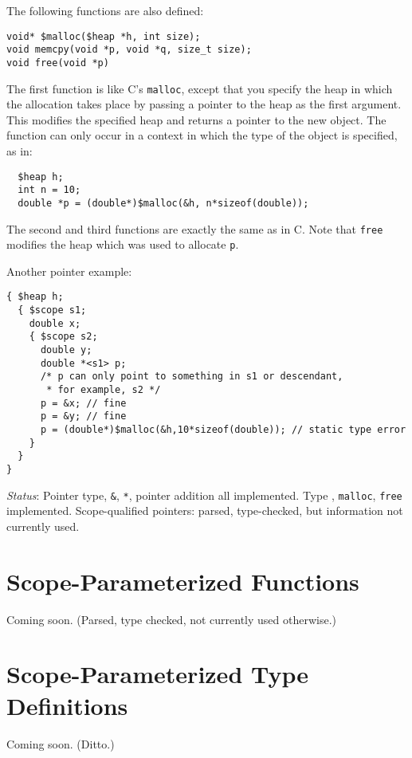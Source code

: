 \documentclass[11pt, oneside, letterpaper]{book}
\begin{document}
The following functions are also defined:
\begin{verbatim}
void* $malloc($heap *h, int size);
void memcpy(void *p, void *q, size_t size);
void free(void *p)
\end{verbatim}
The first function is like C's \texttt{malloc}, except that you
specify the heap in which the allocation takes place by passing a
pointer to the heap as the first argument.  This modifies the
specified heap and returns a pointer to the new object.  The function
can only occur in a context in which the type of the object is
specified, as in:
\begin{verbatim}
  $heap h;
  int n = 10;
  double *p = (double*)$malloc(&h, n*sizeof(double));
\end{verbatim}
The second and third functions are exactly the same as in C. Note that
\texttt{free} modifies the heap which was used to allocate \texttt{p}.

Another pointer example:
\begin{small}
\begin{verbatim}
{ $heap h;
  { $scope s1;
    double x;
    { $scope s2;
      double y;
      double *<s1> p;
      /* p can only point to something in s1 or descendant,
       * for example, s2 */
      p = &x; // fine
      p = &y; // fine
      p = (double*)$malloc(&h,10*sizeof(double)); // static type error
    }
  }
}
\end{verbatim}
\end{small}

\emph{Status}: Pointer type, \texttt{\&}, \texttt{*}, pointer addition
all implemented.  Type \cheap{}, \texttt{malloc}, \texttt{free}
implemented.  Scope-qualified pointers: parsed, type-checked, but
information not currently used.

\section{Scope-Parameterized Functions}

Coming soon.  (Parsed, type checked, not currently used otherwise.)

\section{Scope-Parameterized Type Definitions}

Coming soon. (Ditto.)

\end{document}
